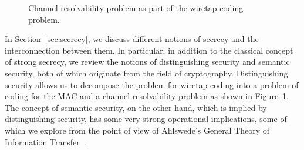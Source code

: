 \documentclass[journal]{IEEEtran}
\newcommand{\channelpmf}{q}
\newcommand{\channelInOne}{X}
\newcommand{\channelInTwo}{Y}
\newcommand{\channelOut}{Z}
\newcommand{\channel}{\mathcal{W}}
\newcommand{\channelOutWiretapper}{\channelOut_\mathrm{tap}}
\newcommand{\channelOutLegit}{\channelOut_\mathrm{legit}}
\begin{document}
\begin{figure}
\begin{center}
\end{center}
\caption{Channel resolvability problem as part of the wiretap coding problem.}
\label{figure:wiretap-decompose}
\end{figure}

In Section~\ref{sec:secrecy}, we discuss different notions of secrecy
and the interconnection between them. In particular, in addition to
the classical concept of strong secrecy, we review the notions of
distinguishing security and semantic security, both of which originate
from the field of cryptography. Distinguishing security allows us to
decompose the problem for wiretap coding into a problem of coding for
the MAC and a channel resolvability problem as shown in
Figure~\ref{figure:wiretap-decompose}. The concept of semantic
security, on the other hand, which is implied by distinguishing
security, has some very strong operational implications, some of which
we explore from the point of view of Ahlswede's General Theory of
Information Transfer~\cite{AhlswedeGeneral}.
\end{document}
